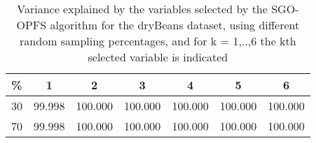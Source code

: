 \begin{table}
	\begin{center}
		\begin{tabular}{c c c c c c c}
			\% & 1 & 2 & 3 & 4 & 5 & 6 \\
			\hline
			30 & 99.998 & 100.000 & 100.000 & 100.000 & 100.000 & 100.000 \\
			70 & 99.998 & 100.000 & 100.000 & 100.000 & 100.000 & 100.000 \\
		\end{tabular}
	\end{center}
	\caption{Variance explained by the variables selected by the SGO-OPFS algorithm for the dryBeans dataset, using different random sampling percentages, and for k = 1,..,6 the kth selected variable is indicated}
\end{table}